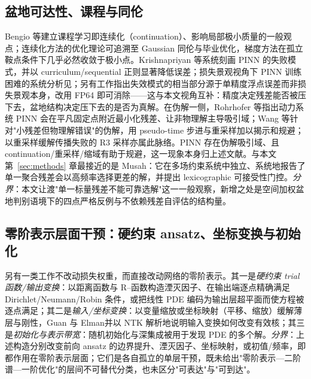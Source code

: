 \documentclass[fontset=windows,11pt]{ctexart}
\numberwithin{equation}{section}
\begin{document}
\subsection{盆地可达性、课程与同伦}\label{sec:rel-curriculum}
Bengio 等\cite{Bengio2009}建立课程学习即连续化（continuation）、影响局部极小质量的一般观点；连续化方法的优化理论可追溯至 Gaussian 同伦与毕业优化\cite{Mobahi2015,Hazan2016}，梯度方法在孤立鞍点条件下几乎必然收敛于极小点\cite{Lee2016}。Krishnapriyan 等\cite{Krishnapriyan2021}系统刻画 PINN 的失败模式，并以 curriculum/sequential 正则显著降低误差；损失景观视角下 PINN 训练困难的系统分析见\cite{Rathore2024}；另有工作指出失效模式的相当部分源于单精度浮点误差而非损失景观本身，改用 FP64 即可消除\cite{FP64Xu2025}——这与本文视角互补：精度决定残差能否被压下去，盆地结构决定压下去的是否为真解。在伪解一侧，Rohrhofer 等\cite{Rohrhofer2022}指出动力系统 PINN 会在平凡固定点附近最小化残差、让非物理解主导吸引域；Wang 等\cite{WangPseudo2026}针对"小残差但物理解错误"的伪解，用 pseudo-time 步进与重采样加以揭示和规避；以重采样缓解传播失败的 R3 采样亦属此脉络\cite{Daw2022Evo}。PINN 存在伪解吸引域、且 continuation/重采样/缩域有助于规避，这一现象本身归上述文献。与本文第~\ref{sec:methods} 章最接近的是 Musah\cite{Musah2026}：它在多场约束系统中独立、系统地报告了单一聚合残差会以高频率选择更差的解，并提出 lexicographic 可接受性门控。\emph{分界}：本文让渡"单一标量残差不能可靠选解"这一一般观察，新增之处是空间加权盆地判别语境下的四点严格反例与不依赖残差自评估的结构量。

\subsection{零阶表示层面干预：硬约束 ansatz、坐标变换与初始化}\label{sec:rel-repr}
另有一类工作不改动损失权重，而直接改动网络的零阶表示。其一是\emph{硬约束 trial 函数/输出变换}：以距离函数与 R--函数构造湮灭因子、在输出端逐点精确满足 Dirichlet/Neumann/Robin 条件\cite{Sukumar2022distance}，或把线性 PDE 编码为输出层超平面而使方程被逐点满足\cite{Leng2022hyperplane}；其二是\emph{输入/坐标变换}：以变量缩放或坐标映射（平移、缩放）缓解薄层与刚性，Guan 与 Elman\cite{GuanElman2024}并以 NTK 解析地说明输入变换如何改变有效核；其三是\emph{初始化与表示带宽}：随机初始化与深集成被用于发现 PDE 的多个解\cite{Zou2025ensemble}。\emph{分界}：上述构造分别改变前向 ansatz 的边界提升、湮灭因子、坐标映射，或初值/频率，即都作用在零阶表示层面；它们是各自孤立的单层干预，既未给出"零阶表示—二阶谱—一阶优化"的层间不可替代分类，也未区分"可表达"与"可到达"。

\FloatBarrier
\end{document}
